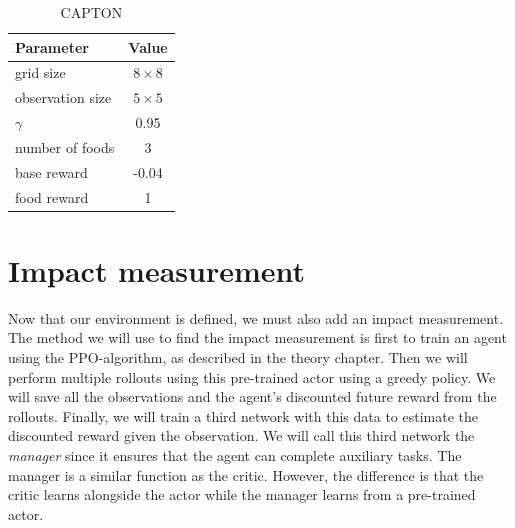 \documentclass[12pt,A4]{report}
\theoremstyle{definition}
\begin{document}
\begin{table}
  \centering
  \begin{tabular}{l | c}
    Parameter& Value \\ \hline
    grid size & $8 \times  8$ \\
    observation size & $5 \times  5$ \\
    $\gamma$ & 0.95 \\
    number of foods & 3 \\
    base reward & -0.04 \\
    food reward & 1 \\
  \end{tabular}
  \caption{CAPTON}
  \label{tab:sim_parms}
\end{table}

\section{Impact measurement}



Now that our environment is defined, we must also add an impact measurement. 
The method we will use to find the impact measurement is first to train an agent using the PPO-algorithm, as described in the theory chapter. Then we will perform multiple rollouts using this pre-trained actor using a greedy policy. We will save all the observations and the agent's discounted future reward from the rollouts. Finally, we will train a third network with this data to estimate the discounted reward given the observation. We will call this third network the \textit{manager} since it ensures that the agent can complete auxiliary tasks. The manager is a similar function as the critic. However, the difference is that the critic learns alongside the actor while the manager learns from a pre-trained actor. 
\end{document}
